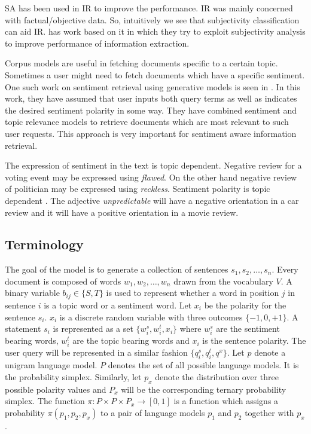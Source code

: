 SA has been used in IR to improve the performance. IR was mainly concerned with factual/objective data. So, intuitively we see
that subjectivity classification can aid IR. \citep*{riloff2005exploiting} has work based on it in which they try to exploit
subjectivity analysis to improve performance of information extraction. 

Corpus models are useful in fetching documents specific to a certain topic. Sometimes a user might need to fetch documents which
have a specific sentiment. One such work on sentiment retrieval using generative models is seen in \citep*{eguchi2006sentiment}.
In this work, they have assumed that user inputs both query terms as well as indicates the desired sentiment polarity in some way.
They have combined sentiment and topic relevance models to retrieve documents which are most relevant to such user requests. This
approach is very important for sentiment aware information retrieval.

The expression of sentiment in the text is topic dependent. Negative review for a voting event may be expressed using \textit{flawed}. 
On the other hand negative review of politician may be expressed using \textit{reckless}. Sentiment polarity is topic dependent \citep*{engstrom2004topic}.
The adjective \textit{unpredictable} will have a negative orientation in a car review and it will have a positive orientation in a
movie review. 

\subsection*{Terminology}

The goal of the model is to generate a collection of sentences \(s_1,s_2,\dots,s_n\). Every document is composed of words \(w_1,w_2,\dots,w_n\)
drawn from the vocabulary \(V\). A binary variable \(b_{ij} \in \{S,T\}\) is used to represent whether a word in position \(j\) in 
sentence \(i\) is a topic word or a sentiment word. Let \(x_i\) be the polarity for the sentence \(s_i\). \(x_i\) is a discrete 
random variable with three outcomes \(\{-1,0,+1\}\). A statement \(s_i\) is represented as a set \(\{w_i^s,w_i^t,x_i\}\) where \(w_i^s\) are the
sentiment bearing words, \(w_i^t\) are the topic bearing words and \(x_i\) is the sentence polarity. The user query will be represented
in a similar fashion \(\{q_i^s,q_i^t,q^x\}\). Let \(p\) denote a unigram language model. \(P\) denotes the set of all possible
language models. It is the probability simplex. Similarly, let \(p_x\) denote the distribution over three possible polarity values and
\(P_x\) will be the corresponding ternary probability simplex. The function \(\pi:P \times P \times P_x\to[0,1]\) is a function which 
assigns a probability \(\pi(p_1,p_2,p_x)\) to a pair of language models \(p_1\) and \(p_2\) together with \(p_x\).

